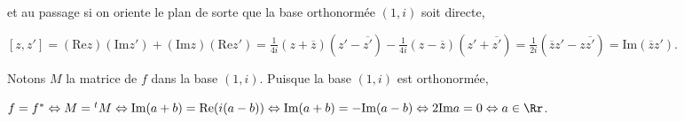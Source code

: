 {\begin{enumerate}
{et au passage si on oriente le plan de sorte que la base orthonormée $(1,i)$ soit directe,

\begin{center}
$[z,z']= (\text{Re}z)(\text{Im}z')+(\text{Im}z)(\text{Re}z') =\frac{1}{4i}(z+\overline{z})(z'-\overline{z'})-\frac{1}{4i}(z-\overline{z})(z'+\overline{z'})=\frac{1}{2i}(\overline{z}z'-z\overline{z'}) =\text{Im}(\overline{z}z')$.
\end{center}

Notons $M$ la matrice de $f$ dans la base $(1,i)$. Puisque la base $(1,i)$ est orthonormée,

\begin{center}
$f = f^*\Leftrightarrow M ={^t}M\Leftrightarrow\text{Im}(a+b) =\text{Re}(i(a-b))\Leftrightarrow\text{Im}(a+b) =-\text{Im}(a-b)\Leftrightarrow2\text{Im}a = 0\Leftrightarrow a\in\Rr$.
\end{center}

\begin{center}
\end{center}}
\end{enumerate}
}
